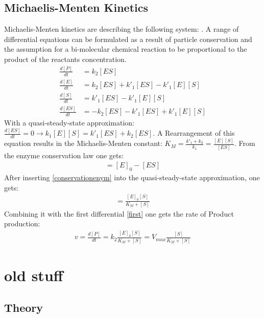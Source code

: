 \documentclass[
  a4paper,BCOR10mm,oneside,
  bibtotoc,idxtotoc,
  headsepline,footsepline,%
  fleqn,openbib
]{scrbook}
\begin{document}
\section{Michaelis-Menten Kinetics}\label{Menten_der}
Michaelis-Menten kinetics are describing the following system:\newline
{}.
A range of differential equations can be formulated as a result of particle conservation and the assumption for a bi-molecular chemical reaction to be proportional to the product of the reactants concentration. 
\begin{align}
\frac{d[P]}{dt} &= k_{\mathrm{2}} [ES] \\ \label{first}
\frac{d[E]}{dt} &= k_{\mathrm{2}} [ES]+k'_{\mathrm{1}} [ES]-k'_{\mathrm{1}} [E][S]\\
\frac{d[S]}{dt} &= k'_{\mathrm{1}} [ES]-k'_{\mathrm{1}} [E][S]\\
\frac{d[ES]}{dt} &=  - k_{\mathrm{2}} [ES] -k'_{\mathrm{1}} [ES]+k'_{\mathrm{1}} [E][S]
\end{align}
With a quasi-steady-state approximation: $\frac{d[ES]}{dt}=0  \longrightarrow k_{\mathrm{1}}[E][S]=k'_{\mathrm{1}}[ES]+k_{\mathrm{2}}[ES]$. A Rearrangement of this equation results in the  Michaelis-Menten constant: $K_M=\frac{k'_{\mathrm{1}}+k_{\mathrm{2}}}{k_{\mathrm{1}}}=\frac{[E][S]}{[ES]}$. From the enzyme conservation law one gets:
\begin{align}
[E]=[E]_0 -[ES] \label{conservationenym}
\end{align}
After inserting \cref{conservationenym} into the quasi-steady-state approximation, one gets:
\begin{align}
 [ES]=\frac{[E]_0 [S]}{K_M+[S]}
\end{align}
Combining it with the first differential \cref{first} one gets the rate of Product production:
\begin{align}
 v= \frac{d[P]}{dt}= k_{\mathrm{2}} \frac{[E]_0 [S]}{K_M+[S]} = V_{max} \frac{[S]}{K_M+[S]}  
\end{align}

\chapter{old stuff}
\section{Theory}
\end{document}
